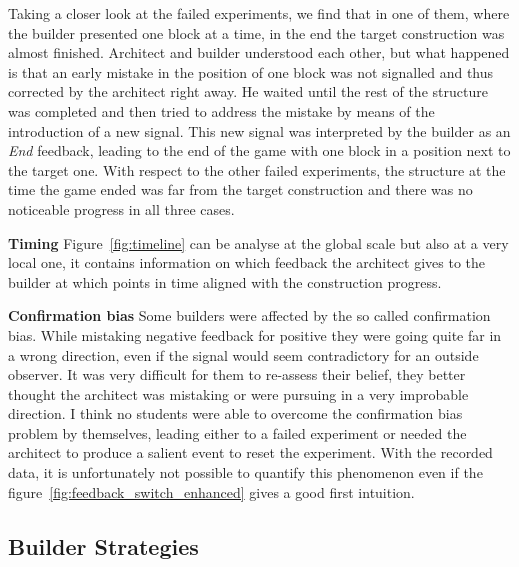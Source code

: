 Taking a closer look at the failed experiments, we find that in one of them, where the builder presented one block at a time, in the end the target construction was almost finished. Architect and builder understood each other, but what happened is that an early mistake in the position of one block was not signalled and thus corrected by the architect right away. He waited until the rest of the structure was completed and then tried to address the mistake by means of the introduction of a new signal. This new signal was interpreted by the builder as an \emph{End} feedback, leading to the end of the game with one block in a position next to the target one. With respect to the other failed experiments, the structure at the time the game ended was far from the target construction and there was no noticeable progress in all three cases.

\textbf{Timing} Figure~\ref{fig:timeline} can be analyse at the global scale but also at a very local one, it contains information on which feedback the architect gives to the builder at which points in time aligned with the construction progress. 

\textbf{Confirmation bias} Some builders were affected by the so called confirmation bias. While mistaking negative feedback for positive they were going quite far in a wrong direction, even if the signal would seem contradictory for an outside observer. It was very difficult for them to re-assess their belief, they better thought the architect was mistaking or were pursuing in a very improbable direction. I think no students were able to overcome the confirmation bias problem by themselves, leading either to a failed experiment or needed the architect to produce a salient event to reset the experiment. With the recorded data, it is unfortunately not possible to quantify this phenomenon even if the figure~\ref{fig:feedback_switch_enhanced} gives a good first intuition.

\subsection{Builder Strategies}


